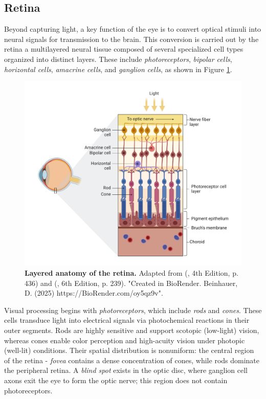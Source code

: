 \subsection{Retina}
\label{subsec:retina}

Beyond capturing light, a key function of the eye is to convert optical stimuli into neural signals for transmission to the brain. This conversion is carried out by the retina a multilayered neural tissue composed of several specialized cell types organized into distinct layers. These include \emph{photoreceptors}, \emph{bipolar cells}, \emph{horizontal cells}, \emph{amacrine cells}, and \emph{ganglion cells}, as shown in Figure \ref{fig:retina_anatomy}.

\begin{figure}
    \centering
    \includegraphics[width=\linewidth]{img/retina_anatomy.pdf}
    \caption{\textbf{Layered anatomy of the retina.} Adapted from (\citet{schwartz1991principles}, 4th Edition, p. 436) and (\citet{purves2019neurosciences}, 6th Edition, p. 239). "Created in BioRender. Beinhauer, D. (2025) https://BioRender.com/oy5qz9v".}
    \label{fig:retina_anatomy}
\end{figure}

Visual processing begins with \emph{photoreceptors}, which include \emph{rods} and \emph{cones}. These cells transduce light into electrical signals via photochemical reactions in their outer segments. Rods are highly sensitive and support scotopic (low-light) vision, whereas cones enable color perception and high-acuity vision under photopic (well-lit) conditions. Their spatial distribution is nonuniform: the central region of the retina - \emph{fovea} contains a dense concentration of cones, while rods dominate the peripheral retina. A \emph{blind spot} exists in the optic disc, where ganglion cell axons exit the eye to form the optic nerve; this region does not contain photoreceptors.    

